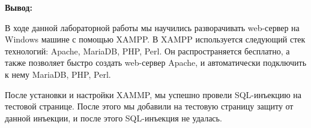 \documentclass[a4paper,14pt]{extarticle}
\begin{document}
    \textbf{Вывод:}

    В ходе данной лабораторной работы мы научились разворачивать web-сервер
    на Windows машине с помощью XAMPP. В XAMPP используется следующий стек 
    технологий: Apache, MariaDB, PHP, Perl. Он распространяется бесплатно, а также
    позволяет быстро создать web-сервер Apache, и автоматически подключить к 
    нему MariaDB, PHP, Perl. \par 
    После установки и настройки XAMMP, мы успешно провели SQL-инъекцию 
    на тестовой странице. После этого мы добавили на тестовую страницу защиту от 
    данной инъекции, и после этого SQL-инъекция не удалась.
    
\end{document}
